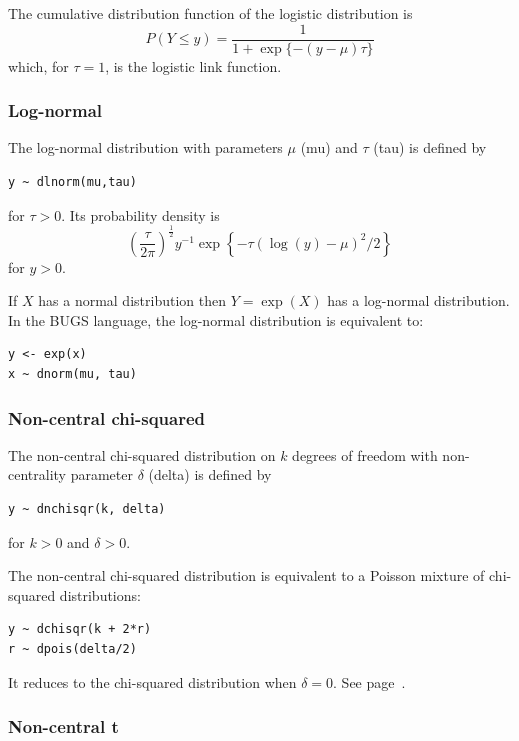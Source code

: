 \documentclass[11pt, a4paper, titlepage]{report}
\begin{document}
The cumulative distribution function of the logistic distribution is
\[
P(Y \leq y) = \frac{1}{\textstyle  1 + \exp\{ - (y - \mu) \tau\}}
\]
which, for $\tau = 1$, is the logistic link function.

\subsubsection{Log-normal}
\label{bugs:dlnorm}

The log-normal distribution with parameters $\mu$ (mu) and $\tau$ (tau) is
defined by
\begin{verbatim}
y ~ dlnorm(mu,tau)
\end{verbatim}
for $\tau > 0$. Its probability density is
\[
\left(
\frac{\tau}{2\pi}
\right)^{\frac{1}{2}} y^{-1} \exp \left\{-\tau (\log(y) - \mu)^2 / 2 \right\}
\]
for $y > 0$.

If $X$ has a normal distribution then $Y = \exp(X)$ has a log-normal
distribution. In the BUGS language, the log-normal distribution is
equivalent to:
\begin{verbatim}
y <- exp(x)
x ~ dnorm(mu, tau)
\end{verbatim}

\subsubsection{Non-central chi-squared}
\label{bugs:dnchisqr}

The non-central chi-squared distribution on $k$ degrees of freedom with
non-centrality parameter $\delta$ (delta) is defined by
\begin{verbatim}
y ~ dnchisqr(k, delta)
\end{verbatim}
for $k > 0$ and $\delta > 0$.

The non-central chi-squared distribution is equivalent to a Poisson
mixture of chi-squared distributions:
\begin{verbatim}
y ~ dchisqr(k + 2*r)
r ~ dpois(delta/2)
\end{verbatim}
It reduces to the chi-squared distribution when $\delta = 0$. See
page~\pageref{bugs:dchisqr}.

\subsubsection{Non-central t}
\label{bugs:dnt}
\end{document}
